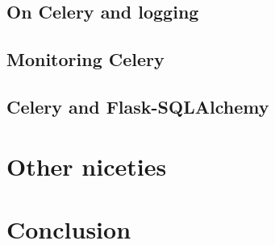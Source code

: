 \documentclass{beamer}
\begin{document}
\subsection{On Celery and logging}

\begin{frame}

\end{frame}
\subsection{Monitoring Celery}

\begin{frame}

\end{frame}

\subsection{Celery and Flask-SQLAlchemy}

\begin{frame}

\end{frame}

\section{Other niceties}



\section*{Conclusion}
\end{document}
